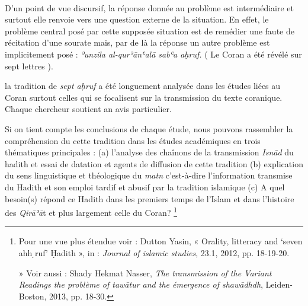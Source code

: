 \documentclass[a4paper,12pt]{report}
\begin{document}
\begin{itemize}
 \paragraph{}
D’un point de vue discursif, la réponse donnée au problème est intermédiaire et  surtout elle renvoie vers une question externe de la situation. En effet, le problème central posé  par cette supposée situation est de remédier une faute de récitation d’une sourate mais, par de là la réponse  un autre problème est implicitement posé : \textit{ʾunzila al-qurʾānʿalā sabʿa aḥruf.}  ( Le Coran a été révélé sur sept lettres ).  

la tradition de\textit{ sept aḥruf} a  été longuement analysée dans les études liées au Coran surtout celles qui  se focalisent sur la transmission du texte coranique. Chaque chercheur soutient an avis particulier. 

 Si on tient  compte les conclusions de chaque  étude,  nous pouvons   rassembler la compréhension du cette tradition dans les études académiques  en  trois thématiques principales : (a) l’analyse  des chaînons de la transmission  \textit{Isnād} du hadith et essai de datation et agents de diffusion  de cette tradition  (b) explication du sens linguistique et théologique du \textit{matn}  c’est-à-dire l’information transmise du Hadith et son emploi tardif et abusif par la tradition islamique  (c)  A quel besoin(s) répond ce Hadith dans les premiers temps de l’Islam et dans l’histoire des \textit{Qirāʾā}t et plus largement celle du Coran? \footnote{Pour une vue plus étendue voir : Dutton Yasin, « Orality, litteracy and ‘seven ahh ̣ruf’ Ḥadith », in : \textit{Journal of islamic studies}, 23.1, 2012, pp. 18-19-20. 


»
Voir aussi : Shady Hekmat Nasser, \textit{The transmission of the Variant Readings the problème of tawātur and the émergence of shawādhdh}, Leiden-Boston, 2013, pp. 18-30.} 


































\end{itemize}
\end{document}
